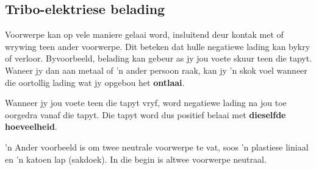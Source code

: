 \subsection{Tribo-elektriese belading}
\nopagebreak
Voorwerpe kan op vele maniere gelaai word, insluitend deur kontak met of wrywing teen ander voorwerpe. Dit beteken dat hulle negatiewe lading kan bykry of verloor. Byvoorbeeld, belading kan gebeur as jy jou voete skuur teen die tapyt. Waneer jy dan aan metaal of 'n ander persoon raak, kan jy 'n skok voel wanneer die oortollig lading wat jy opgebou het \textbf{ontlaai}.\par


Wanneer jy jou voete teen die tapyt vryf, word negatiewe lading na jou toe oorgedra vanaf die tapyt. Die tapyt word dus positief belaai met \textbf{dieselfde hoeveelheid}. \par
      

 'n Ander voorbeeld is om twee neutrale voorwerpe te vat, soos 'n plastiese liniaal en 'n katoen lap (sakdoek). In die begin is altwee voorwerpe neutraal.\par
      

